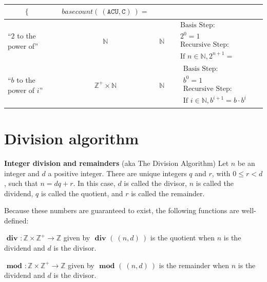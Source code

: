\documentclass[12pt, oneside]{article}
\newcommand{\A}[0]{\texttt{A}}
\newcommand{\C}[0]{\texttt{C}}
\newcommand{\U}[0]{\texttt{U}}
\begin{document}
\begin{center}
\begin{tabular}{p{0.65in}ccp{2.4in}p{2.4in}}
{\begin{align*}
\begin{cases}
    \end{cases}
    \end{align*}} & 
    {\begin{align*}
        basecount(~(\A\C\U, \C)~) = 
    \end{align*}}\\
\hline
``$2$ to the power of''& $\mathbb{N}$ & $\mathbb{N}$ & 
{\begin{align*}    
&\textrm{Basis Step:} \\
&2^0= 1 \\
&\textrm{Recursive Step:}\\
&\textrm{If } n \in \mathbb{N}, 2^{n+1} = \phantom{2 \cdot 2^n}
\end{align*}}\\
\hline
``$b$ to the power of $i$''& $\mathbb{Z}^+ \times \mathbb{N}$ & $\mathbb{N}$ & 
{\begin{align*}    
&\textrm{Basis Step:} \\
&b^0 = 1 \\
&\textrm{Recursive Step:}\\
&\textrm{If } i \in \mathbb{N}, b^{i+1} = b \cdot b^i
\end{align*}}
\end{tabular}
\end{center}

\newpage \vfill
\section*{Division algorithm}


{\bf Integer division and remainders} (aka The Division Algorithm) Let $n$ be an integer 
and $d$ a positive integer. There are unique integers $q$ and $r$, with $0 \leq r < d$, such that 
$n = dq + r$. In this case, $d$ is called the divisor, $n$ is called the dividend, 
$q$ is called the quotient, 
and $r$ is called the remainder. 

Because these numbers are guaranteed to exist, the following functions are well-defined: 

$\textbf{ div } : \mathbb{Z} \times \mathbb{Z}^+ \to \mathbb{Z}$ given by $\textbf{ div } ( ~(n,d)~)$ 
is the quotient when $n$ is the dividend and $d$ is the divisor.

$\textbf{ mod } : \mathbb{Z} \times \mathbb{Z}^+ \to \mathbb{Z}$ given by $\textbf{ mod } ( ~(n,d)~)$ 
is the remainder when $n$ is the dividend and $d$ is the divisor.
\end{document}
